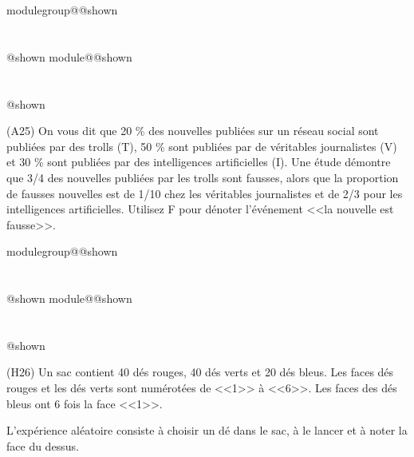 \documentclass{Evaluation}
\makeatletter
\newcommand{\currentmodulekey}{}
\newcommand{\currentmoduletitle}{}
\newcommand{\currentgroupkey}{}
\newcommand{\currentgrouptitle}{}
\newcommand{\showmoduleifneeded}{%
  \ifx\currentgroupkey\empty\else
    \expandafter\ifx\csname modulegroup@\currentgroupkey @shown\endcsname\relax
      \section*{\currentgrouptitle}%
      \expandafter\gdef\csname modulegroup@\currentgroupkey @shown\endcsname{1}%
    \fi
  \fi
  \expandafter\ifx\csname module@\currentmodulekey @shown\endcsname\relax
    \section*{\currentmoduletitle}%
    \expandafter\gdef\csname module@\currentmodulekey @shown\endcsname{1}%
  \fi
}
\newenvironment{A25}{\showmoduleifneeded}{}
\newenvironment{H26}{\showmoduleifneeded}{}
\makeatother
\begin{document}
\begin{questions}
\begin{A25}
\question (A25) On vous dit que 20 \% des nouvelles publiées sur un réseau social sont publiées par des trolls (T), 50 \% sont publiées par de véritables journalistes (V)
et 30 \% sont publiées par des intelligences artificielles (I). Une étude démontre que 3/4 des nouvelles publiées par les trolls sont fausses, alors que
la proportion de fausses nouvelles est de 1/10 chez les véritables journalistes et de 2/3 pour les intelligences artificielles. 
Utilisez F pour dénoter l'événement <<la nouvelle est fausse>>.

\end{A25}

\begin{H26}
\question (H26) Un sac contient 40 dés rouges, 40 dés verts et 20 dés bleus.
Les faces dés rouges et les dés verts sont numérotées de <<1>> à <<6>>.
Les faces des dés bleus ont 6 fois la face <<1>>.

L'expérience aléatoire consiste à choisir un dé dans le sac, à le lancer et à noter la face du dessus.


\end{H26}
\end{questions}
\end{document}
